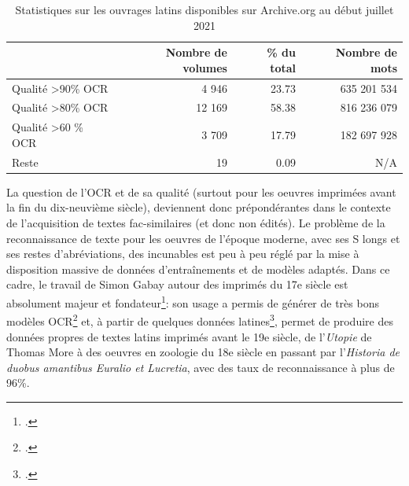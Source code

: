 \begin{table}[ht]
\centering
\begin{tabular}{l|rrr}
\toprule
                               & Nombre de volumes & \% du total & Nombre de mots \\ \midrule
Qualité \textgreater 90\% OCR  & 4 946              & 23.73       & 635 201 534    \\
Qualité \textgreater 80\% OCR  & 12 169             & 58.38       & 816 236 079      \\
Qualité \textgreater 60 \% OCR & 3 709              & 17.79       & 182 697 928      \\
Reste                          & 19                 & 0.09        & N/A           \\ \bottomrule
\end{tabular}
\caption{Statistiques sur les ouvrages latins disponibles sur Archive.org au début juillet 2021}
\label{tab:chap1:latin-OCR}
\end{table}

La question de l'OCR et de sa qualité (surtout pour les oeuvres imprimées avant la fin du dix-neuvième siècle), deviennent donc prépondérantes dans le contexte de l'acquisition de textes fac-similaires (et donc non édités). Le problème de la reconnaissance de texte pour les oeuvres de l'époque moderne, avec ses S longs et ses restes d'abréviations, des incunables est peu à peu réglé par la mise à disposition massive de données d'entraînements et de modèles adaptés. Dans ce cadre, le travail de Simon Gabay autour des imprimés du 17e siècle est absolument majeur et fondateur\footcite{simon_gabay_2020_3826894}: son usage a permis de générer de très bons modèles OCR\footcite{gabay:hal-02577236} et, à partir de quelques données latines\footcite{Clerice_CREMMA_16_18_Prints_2021}, permet de produire des données propres de textes latins imprimés avant le 19e siècle, de l'\textit{Utopie} de Thomas More à des oeuvres en zoologie du 18e siècle en passant par l'\textit{Historia de duobus amantibus Euralio et Lucretia}, avec des taux de reconnaissance à plus de 96\%. 

